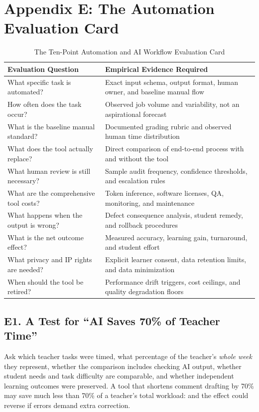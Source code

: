 \section*{Appendix E: The Automation Evaluation Card}

\begin{table}[t]
\centering
\small
\caption{The Ten-Point Automation and AI Workflow Evaluation Card}
\begin{tabularx}{\textwidth}{p{}X}
\toprule
\textbf{Evaluation Question} & \textbf{Empirical Evidence Required} \\
\midrule
What specific task is automated? & Exact input schema, output format, human owner, and baseline manual flow \\
How often does the task occur? & Observed job volume and variability, not an aspirational forecast \\
What is the baseline manual standard? & Documented grading rubric and observed human time distribution \\
What does the tool actually replace? & Direct comparison of end-to-end process with and without the tool \\
What human review is still necessary? & Sample audit frequency, confidence thresholds, and escalation rules \\
What are the comprehensive tool costs? & Token inference, software licenses, QA, monitoring, and maintenance \\
What happens when the output is wrong? & Defect consequence analysis, student remedy, and rollback procedures \\
What is the net outcome effect? & Measured accuracy, learning gain, turnaround, and student effort \\
What privacy and IP rights are needed? & Explicit learner consent, data retention limits, and data minimization \\
When should the tool be retired? & Performance drift triggers, cost ceilings, and quality degradation floors \\
\bottomrule
\end{tabularx}
\end{table}

\subsection*{E1. A Test for ``AI Saves 70\% of Teacher Time''}

Ask which teacher tasks were timed, what percentage of the teacher's \emph{whole week} they represent, whether the comparison includes checking AI output, whether student needs and task difficulty are comparable, and whether independent learning outcomes were preserved. A tool that shortens comment drafting by 70\% may save much less than 70\% of a teacher's total workload: and the effect could reverse if errors demand extra correction.

